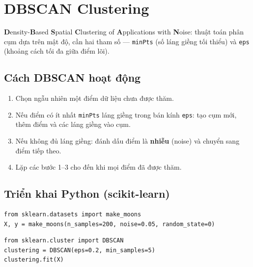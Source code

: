 \section{DBSCAN Clustering}
\label{sec:dbscan}

\begin{dinhnghia}[title={DBSCAN}]
\textbf{D}ensity-\textbf{B}ased \textbf{S}patial \textbf{C}lustering of \textbf{A}pplications with \textbf{N}oise:
thuật toán phân cụm dựa trên mật độ, cần hai tham số --- \texttt{minPts} (số láng giềng tối thiểu) và \texttt{eps} (khoảng cách tối đa giữa điểm lõi).
\end{dinhnghia}

\subsection{Cách DBSCAN hoạt động}

\begin{phuongphap}[title={Các bước thuật toán}]
\begin{enumerate}
  \item Chọn ngẫu nhiên một điểm dữ liệu chưa được thăm.
  \item Nếu điểm có ít nhất \texttt{minPts} láng giềng trong bán kính \texttt{eps}: tạo cụm mới, thêm điểm và các láng giềng vào cụm.
  \item Nếu không đủ láng giềng: đánh dấu điểm là \textbf{nhiễu} (noise) và chuyển sang điểm tiếp theo.
  \item Lặp các bước 1--3 cho đến khi mọi điểm đã được thăm.
\end{enumerate}
\end{phuongphap}

\subsection{Triển khai Python (scikit-learn)}

\begin{vidu}[title={Bước 1: Nạp dataset make\_moons}]
\begin{lstlisting}
from sklearn.datasets import make_moons
X, y = make_moons(n_samples=200, noise=0.05, random_state=0)
\end{lstlisting}
\end{vidu}

\begin{vidu}[title={Bước 2: DBSCAN với eps và min\_samples}]
\begin{lstlisting}
from sklearn.cluster import DBSCAN
clustering = DBSCAN(eps=0.2, min_samples=5)
clustering.fit(X)
\end{lstlisting}
\end{vidu}

